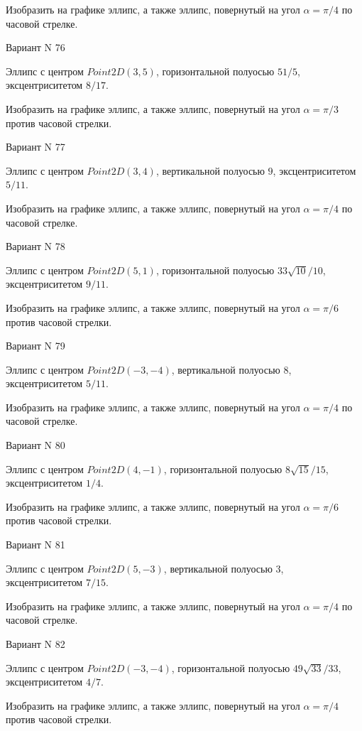 \documentclass[11pt]{report}
\begin{document}
    Изобразить на графике эллипс, а также эллипс, повернутый на угол $\alpha = $$\pi / 4$ по часовой стрелке.

Вариант N 76

Эллипс с центром $Point2D\left(3, 5\right)$, горизонтальной полуосью $51 / 5$, эксцентриситетом $8 / 17$.

    Изобразить на графике эллипс, а также эллипс, повернутый на угол $\alpha = $$\pi / 3$ против часовой стрелки.

Вариант N 77

Эллипс с центром $Point2D\left(3, 4\right)$, вертикальной полуосью $9$, эксцентриситетом $5 / 11$.

    Изобразить на графике эллипс, а также эллипс, повернутый на угол $\alpha = $$\pi / 4$ по часовой стрелке.

Вариант N 78

Эллипс с центром $Point2D\left(5, 1\right)$, горизонтальной полуосью $33 \sqrt{10} / 10$, эксцентриситетом $9 / 11$.

    Изобразить на графике эллипс, а также эллипс, повернутый на угол $\alpha = $$\pi / 6$ против часовой стрелки.

Вариант N 79

Эллипс с центром $Point2D\left(-3, -4\right)$, вертикальной полуосью $8$, эксцентриситетом $5 / 11$.

    Изобразить на графике эллипс, а также эллипс, повернутый на угол $\alpha = $$\pi / 4$ по часовой стрелке.

Вариант N 80

Эллипс с центром $Point2D\left(4, -1\right)$, горизонтальной полуосью $8 \sqrt{15} / 15$, эксцентриситетом $1 / 4$.

    Изобразить на графике эллипс, а также эллипс, повернутый на угол $\alpha = $$\pi / 6$ против часовой стрелки.

Вариант N 81

Эллипс с центром $Point2D\left(5, -3\right)$, вертикальной полуосью $3$, эксцентриситетом $7 / 15$.

    Изобразить на графике эллипс, а также эллипс, повернутый на угол $\alpha = $$\pi / 4$ по часовой стрелке.

Вариант N 82

Эллипс с центром $Point2D\left(-3, -4\right)$, горизонтальной полуосью $49 \sqrt{33} / 33$, эксцентриситетом $4 / 7$.

    Изобразить на графике эллипс, а также эллипс, повернутый на угол $\alpha = $$\pi / 4$ против часовой стрелки.
\end{document}
